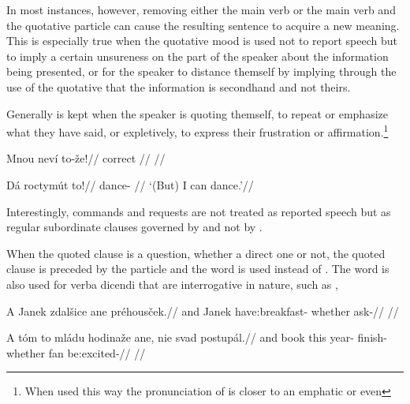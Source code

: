 In most instances, however, removing either the main verb or the main verb and the quotative particle can cause the resulting sentence to acquire a new meaning. This is especially true when the quotative mood is used not to report speech but to imply a certain unsureness on the part of the speaker about the information being presented, or for the speaker to distance themself by implying through the use of the quotative that the information is secondhand and not theirs.

Generally  is kept when the speaker is quoting themself, to repeat or emphasize what they have said, or expletively, to express their frustration or affirmation.\footnote{When used this way the pronunciation of  is closer to an emphatic  or even }


\pex
\begingl
\gla Mnou nev\'i to-\v{z}e!//
\glb correct  //
\glft {}//
\endgl
\xe

\pex
\begingl
\gla Dá roctymút to!//
\glb {} dance- //
\glft `(But) I can dance.'//
\endgl
\xe


Interestingly, commands and requests are not treated as reported speech but as regular subordinate clauses governed by  and not by .

When the quoted clause is a question, whether a direct one or not, the quoted clause is preceded by the particle  and the word  is used instead of . The word  is also used for verba dicendi that are interrogative in nature, such as ,

\pex
\begingl
  \gla A Janek zdal\v{s}ice ane pr\'ehous\v{c}ek.//
  \glb and Janek have:breakfast- whether ask-//
  \glft {}//
\endgl
\xe

\pex
\begingl
  \gla A t\'om to ml\'adu hodina\v{z}e ane, nie svad postup\'al.//
  \glb and book this year- finish- whether  fan be:excited-//
  \glft {}//
\endgl
\xe
